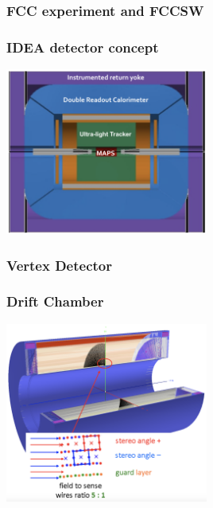 \documentclass[hyperref={colorlinks=true,pdfpagelabels=false,linkcolor=black}, xcolor=dvipsnames,10pt]{beamer}
\begin{document}
\begin{frame}
	\frametitle{FCC experiment and FCCSW}
\end{frame}

\begin{frame}
	\frametitle{IDEA detector concept}
	
	\centering
	\includegraphics[width=0.5\textwidth]{../figures/FCCeeIDEAConcept.png}
\end{frame}

\begin{frame}
	\frametitle{Vertex Detector}
\end{frame}

\begin{frame}
	\frametitle{Drift Chamber}
	
	\centering
	\includegraphics[width=0.5\textwidth]{../figures/DriftChamber.png}
\end{frame}
\end{document}
